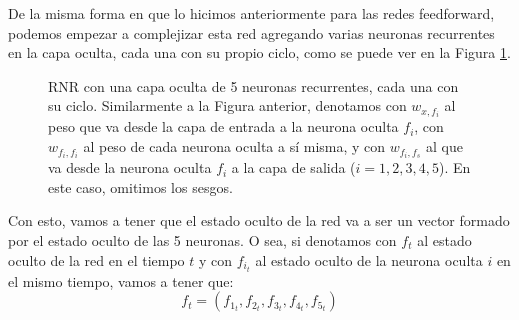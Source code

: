 \documentclass[../../main.tex]{subfiles}
\begin{document}
De la misma forma en que lo hicimos anteriormente para las redes feedforward, podemos
empezar a complejizar esta red agregando varias neuronas recurrentes en la capa oculta,
cada una con su propio ciclo, como se puede ver en la Figura \ref{fig:simple-rnn-2}.
\begin{figure}[ht]
    \centering
    \caption{RNR con una capa oculta de 5 neuronas recurrentes, cada una con su ciclo.
    Similarmente a la Figura anterior, denotamos con \(w_{x,f_i}\) al peso que va desde la
    capa de entrada a la neurona oculta \(f_i\), con \(w_{f_i, f_i}\) al peso de cada
    neurona oculta a sí misma, y con \(w_{f_i, f_s}\) al que va desde la neurona oculta
    \(f_i\) a la capa de salida (\(i=1,2,3,4,5\)). En este caso, omitimos los sesgos.}
    \label{fig:simple-rnn-2}
\end{figure}

Con esto, vamos a tener que el estado oculto de la red va a ser un vector formado por el
estado oculto de las 5 neuronas. O sea, si denotamos con \(f_t\) al estado oculto de la
red en el tiempo \(t\) y con \(f_{i_t}\) al estado oculto de la neurona oculta \(i\) en el
mismo tiempo, vamos a tener que:
\begin{equation*}
    f_t = (f_{1_t}, f_{2_t}, f_{3_t}, f_{4_t}, f_{5_t})
\end{equation*}
\end{document}

